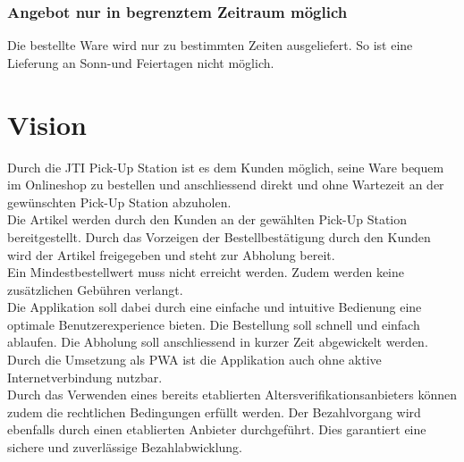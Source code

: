 \subsubsection{Angebot  nur in begrenztem Zeitraum möglich}
Die bestellte Ware wird nur zu bestimmten Zeiten ausgeliefert. So ist eine Lieferung an Sonn-und Feiertagen nicht möglich. 

\section{Vision}
Durch die JTI Pick-Up Station ist es dem Kunden möglich, seine Ware bequem im Onlineshop zu bestellen und anschliessend direkt und ohne Wartezeit an der gewünschten Pick-Up Station abzuholen. \\
Die Artikel werden durch den Kunden an der gewählten Pick-Up Station bereitgestellt. Durch das Vorzeigen der Bestellbestätigung durch den Kunden wird der Artikel freigegeben und steht zur Abholung bereit.\\ 
Ein Mindestbestellwert muss nicht erreicht werden. Zudem werden keine zusätzlichen Gebühren verlangt. \\
Die Applikation soll dabei durch eine einfache und intuitive Bedienung eine optimale Benutzerexperience bieten. Die Bestellung soll schnell und einfach ablaufen. Die Abholung soll anschliessend in kurzer Zeit abgewickelt werden. Durch die Umsetzung als \ac{PWA} ist die Applikation auch ohne aktive Internetverbindung nutzbar. \\
Durch das Verwenden eines bereits etablierten Altersverifikationsanbieters können zudem die rechtlichen Bedingungen erfüllt werden. Der Bezahlvorgang wird ebenfalls durch einen etablierten Anbieter durchgeführt. Dies garantiert eine sichere und zuverlässige Bezahlabwicklung. 

\newpage